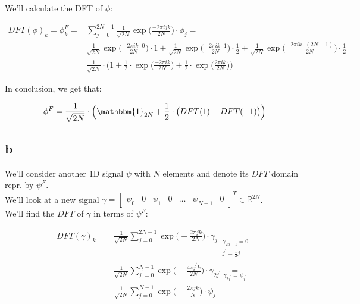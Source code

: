 \documentclass[english]{extarticle}
\numberwithin{equation}{section}
\numberwithin{figure}{section}
\begin{document}
We'll calculate the DFT of $\phi$:

\begin{align*}
    DFT(\phi)_{k} = \phi_{k}^{F} = & \sum_{j=0}^{2N-1} \frac{1}{\sqrt{2N}} \exp \big( \frac{-2\pi ijk}{2N} \big) \cdot \phi_{j} = \\
    & \frac{1}{\sqrt{2N}} \exp \big( \frac{-2\pi ik\cdot 0}{2N} \big) \cdot 1 + \frac{1}{\sqrt{2N}} \exp \big( \frac{-2\pi ik \cdot 1}{2N} \big) \cdot \frac{1}{2} + \frac{1}{\sqrt{2N}} \exp \big( \frac{-2\pi ik \cdot (2N-1)}{2N} \big) \cdot \frac{1}{2} = \\
    & \frac{1}{\sqrt{2N}} \cdot \Big( 1 + \frac{1}{2} \cdot \exp \big( \frac{-2\pi ik}{2N} \big) + \frac{1}{2} \cdot \exp \big( \frac{2\pi ik}{2N} \big) \Big)
\end{align*}

In conclusion, we get that:

\begin{align*}
    \phi^{F} = \frac{1}{\sqrt{2N}} \cdot \Big( \mathbbm{1}_{2N} + \frac{1}{2} \cdot \big( DFT(1) + DFT(-1) \big) \Big)
\end{align*}

\subsection*{b}

We'll consider another 1D signal $\psi$ with $N$ elements and denote its $DFT$ domain repr. by $\psi^{F}$. \\
We'll look at a new signal $\gamma = \begin{bmatrix} \psi_0 & 0 & \psi_1 & 0 & \dots & \psi_{N-1} & 0 \end{bmatrix}^T \in \mathbb{R}^{2N}$.\\
We'll find the $DFT$ of $\gamma$ in terms of $\psi^F$:

\begin{align*}
    DFT(\gamma)_{k} = 
    & \frac{1}{\sqrt{2N}} \sum_{j=0}^{2N-1} \exp \big(-\frac{2\pi jk}{2N} \big) \cdot \gamma_{j} \underset{\substack{\gamma_{2n-1}=0 \\ j^{\prime}=\frac{1}{2}j}}{=} \\
    & \frac{1}{\sqrt{2N}} \sum_{j^{\prime}=0}^{N-1} \exp \big(-\frac{4\pi j^{\prime} k}{2N} \big) \cdot \gamma_{2j^{\prime}} \underset{\gamma_{2j^{\prime}} = \psi_{j^{\prime}}}{=} \\
    & \frac{1}{\sqrt{2N}} \sum_{j=0}^{N-1} \exp \big(-\frac{2\pi jk}{N} \big) \cdot \psi_{j}
\end{align*}
\end{document}
